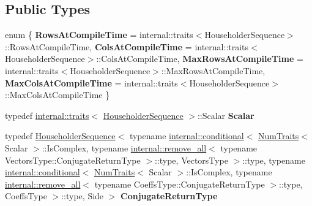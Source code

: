\subsection*{Public Types}
\begin{DoxyCompactItemize}
\item 
\mbox{\label{class_eigen_1_1_householder_sequence_ab653946d8793d085132b033050c0fe5f}} 
enum \{ {\bfseries Rows\+At\+Compile\+Time} = internal\+::traits$<$Householder\+Sequence$>$\+::Rows\+At\+Compile\+Time, 
{\bfseries Cols\+At\+Compile\+Time} = internal\+::traits$<$Householder\+Sequence$>$\+::Cols\+At\+Compile\+Time, 
{\bfseries Max\+Rows\+At\+Compile\+Time} = internal\+::traits$<$Householder\+Sequence$>$\+::Max\+Rows\+At\+Compile\+Time, 
{\bfseries Max\+Cols\+At\+Compile\+Time} = internal\+::traits$<$Householder\+Sequence$>$\+::Max\+Cols\+At\+Compile\+Time
 \}
\item 
\mbox{\label{class_eigen_1_1_householder_sequence_a3d464600d251c30a702ac584c0511b7e}} 
typedef \mbox{\hyperlink{struct_eigen_1_1internal_1_1traits}{internal\+::traits}}$<$ \mbox{\hyperlink{class_eigen_1_1_householder_sequence}{Householder\+Sequence}} $>$\+::Scalar {\bfseries Scalar}
\item 
\mbox{\label{class_eigen_1_1_householder_sequence_a4b40914484b1a2fb3dbf3ea3ebf60252}} 
typedef \mbox{\hyperlink{class_eigen_1_1_householder_sequence}{Householder\+Sequence}}$<$ typename \mbox{\hyperlink{struct_eigen_1_1internal_1_1conditional}{internal\+::conditional}}$<$ \mbox{\hyperlink{struct_eigen_1_1_num_traits}{Num\+Traits}}$<$ Scalar $>$\+::Is\+Complex, typename \mbox{\hyperlink{struct_eigen_1_1internal_1_1remove__all}{internal\+::remove\+\_\+all}}$<$ typename Vectors\+Type\+::\+Conjugate\+Return\+Type $>$\+::type, Vectors\+Type $>$\+::type, typename \mbox{\hyperlink{struct_eigen_1_1internal_1_1conditional}{internal\+::conditional}}$<$ \mbox{\hyperlink{struct_eigen_1_1_num_traits}{Num\+Traits}}$<$ Scalar $>$\+::Is\+Complex, typename \mbox{\hyperlink{struct_eigen_1_1internal_1_1remove__all}{internal\+::remove\+\_\+all}}$<$ typename Coeffs\+Type\+::\+Conjugate\+Return\+Type $>$\+::type, Coeffs\+Type $>$\+::type, Side $>$ {\bfseries Conjugate\+Return\+Type}
\end{DoxyCompactItemize}
